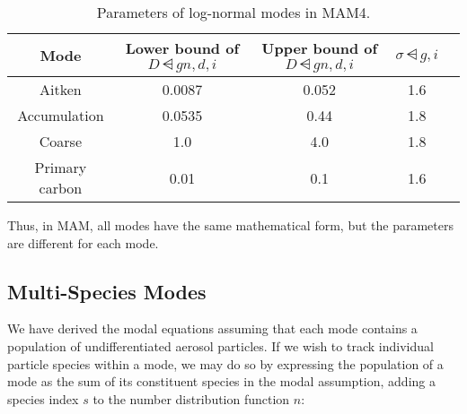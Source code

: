 \begin{table}[htbp]
\centering
\caption{Parameters of log-normal modes in MAM4.}
\label{tab:mode_size_parameters}
\begin{tabular}{ccccc}
  \toprule
  Mode           &  Lower bound of $D\dsub{gn,d,i}$
                 &  Upper bound of $D\dsub{gn,d,i}$  &  $\sigma\dsub{g,i}$ \\
  \midrule
  Aitken 	 &  0.0087  &   0.052  &  1.6 \\
  Accumulation   &  0.0535  &   0.44   &  1.8 \\
  Coarse         &  1.0     &   4.0    &  1.8 \\
  Primary carbon &  0.01    &   0.1    &  1.6 \\
  \bottomrule
\end{tabular}
\end{table}

Thus, in MAM, all modes have the same mathematical form, but the parameters
are different for each mode.

\subsection*{Multi-Species Modes}

We have derived the modal equations assuming that each mode contains a
population of undifferentiated aerosol particles. If we wish to track individual
particle species within a mode, we may do so by expressing the population of a
mode as the sum of its constituent species in the modal assumption, adding
a species index $s$ to the number distribution function $n$:

